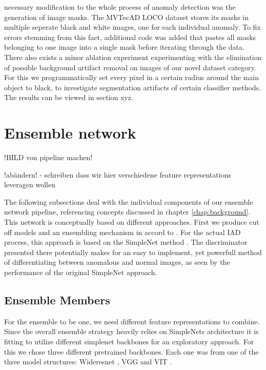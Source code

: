 necessary modification to the whole process of anomaly detection was the generation of image masks. The MVTecAD LOCO dataset stores its 
masks in multiple seperate black and white images, one for each individual anomaly. To fix errors stemming from this fact, additional 
code was added that pastes all masks belonging to one image into a single mask before iterating through the data. 
There also exists a minor ablation experiment experimenting with the elimination 
of possible background artifact removal on images of our novel dataset category. For this we programmatically set every pixel in a certain radius around the main object to black, to investigate 
segmentation artifacts of certain classifier methods. The results can be viewed in section xyz.




\section{Ensemble network}
\label{sec:ourensemblenetwork}

!BILD von pipeline machen!

!abändern!
- schreiben dass wir hier verschiedene feature representations leveragen wollen

The following subsections deal with the individual components of our ensemble network pipeline, referencing concepts discussed in chapter \ref{chap:background}. This network is conceptually based on 
different approaches. First we produce cut off models and an ensembling mechanism in accord to \cite{EnsembleHeller2023}. For the actual IAD process, this approach is based on the SimpleNet method \cite{liu2023simplenet}. 
The discriminator presented there potentially makes for an easy to implement, yet powerfull method of differentiating between anomalous and normal images, as seen by the performance of the original 
SimpleNet approach. 


\subsection{Ensemble Members}
\label{sec:ensemblecandidates}

For the ensemble to be one, we need different feature representations to combine. Since the overall ensemble strategy heavily relies on SimpleNets \cite{liu2023simplenet} architecture 
it is fitting to utilize different simplenet backbones for an exploratory approach. For this we chose three different pretrained backbones. Each one was from one of the three 
model structures: Wideresnet \cite{wideresnet}, VGG \cite{VGG} and VIT \cite{VIT}. 

